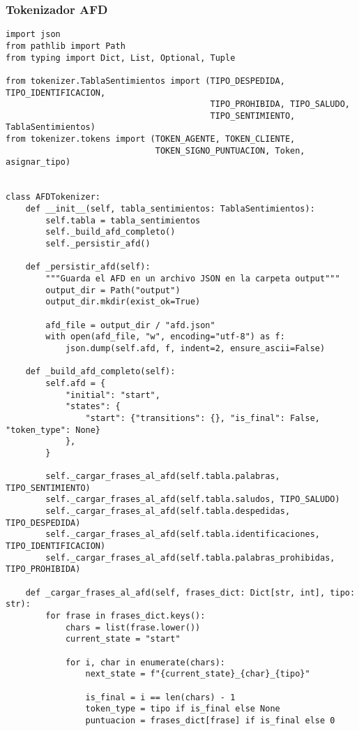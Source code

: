 \subsubsection{Tokenizador AFD}
\begin{lstlisting}
import json
from pathlib import Path
from typing import Dict, List, Optional, Tuple

from tokenizer.TablaSentimientos import (TIPO_DESPEDIDA, TIPO_IDENTIFICACION,
                                         TIPO_PROHIBIDA, TIPO_SALUDO,
                                         TIPO_SENTIMIENTO, TablaSentimientos)
from tokenizer.tokens import (TOKEN_AGENTE, TOKEN_CLIENTE,
                              TOKEN_SIGNO_PUNTUACION, Token, asignar_tipo)


class AFDTokenizer:
    def __init__(self, tabla_sentimientos: TablaSentimientos):
        self.tabla = tabla_sentimientos
        self._build_afd_completo()
        self._persistir_afd()

    def _persistir_afd(self):
        """Guarda el AFD en un archivo JSON en la carpeta output"""
        output_dir = Path("output")
        output_dir.mkdir(exist_ok=True)

        afd_file = output_dir / "afd.json"
        with open(afd_file, "w", encoding="utf-8") as f:
            json.dump(self.afd, f, indent=2, ensure_ascii=False)

    def _build_afd_completo(self):
        self.afd = {
            "initial": "start",
            "states": {
                "start": {"transitions": {}, "is_final": False, "token_type": None}
            },
        }

        self._cargar_frases_al_afd(self.tabla.palabras, TIPO_SENTIMIENTO)
        self._cargar_frases_al_afd(self.tabla.saludos, TIPO_SALUDO)
        self._cargar_frases_al_afd(self.tabla.despedidas, TIPO_DESPEDIDA)
        self._cargar_frases_al_afd(self.tabla.identificaciones, TIPO_IDENTIFICACION)
        self._cargar_frases_al_afd(self.tabla.palabras_prohibidas, TIPO_PROHIBIDA)

    def _cargar_frases_al_afd(self, frases_dict: Dict[str, int], tipo: str):
        for frase in frases_dict.keys():
            chars = list(frase.lower())
            current_state = "start"

            for i, char in enumerate(chars):
                next_state = f"{current_state}_{char}_{tipo}"

                is_final = i == len(chars) - 1
                token_type = tipo if is_final else None
                puntuacion = frases_dict[frase] if is_final else 0


\end{lstlisting}
